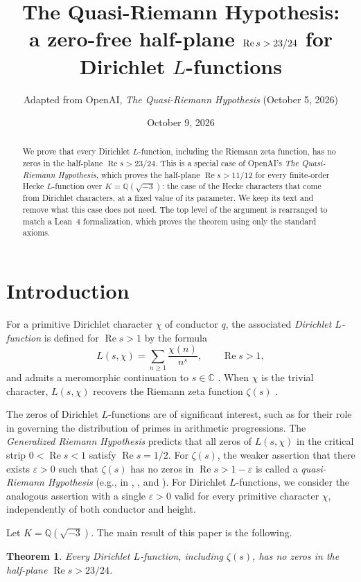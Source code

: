 \documentclass[11pt,a4paper]{article}
\title{The Quasi-Riemann Hypothesis:\\ a zero-free half-plane $\Rea s>23/24$ for Dirichlet $L$-functions}
\author{Adapted from OpenAI, \emph{The Quasi-Riemann Hypothesis} (October 5, 2026)}
\date{October 9, 2026}
\numberwithin{equation}{section}
\numberwithin{figure}{section}
\newtheorem{theorem}{Theorem}[section]
\theoremstyle{definition}
\theoremstyle{remark}
\newcommand{\Q}{\mathbb Q}
\newcommand{\C}{\mathbb C}
\newcommand{\Rea}{\operatorname{Re}}
\begin{document}
\maketitle
\begin{abstract}
We prove that every Dirichlet $L$-function, including the Riemann zeta function, has no zeros in the half-plane $\Rea s>23/24$. This is a special case of OpenAI's \emph{The Quasi-Riemann Hypothesis}, which proves the half-plane $\Rea s>11/12$ for every finite-order Hecke $L$-function over $K=\Q(\sqrt{-3})$: the case of the Hecke characters that come from Dirichlet characters, at a fixed value of its parameter. We keep its text and remove what this case does not need. The top level of the argument is rearranged to match a Lean~4 formalization, which proves the theorem using only the standard axioms.
\end{abstract}

\tableofcontents

\section{Introduction}\label{sec:intro}

For a primitive Dirichlet character $\chi$ of conductor $q$, the associated \emph{Dirichlet $L$-function} is defined for $\Rea s>1$ by the formula
\[
 L(s,\chi)=\sum_{n\ge1}\frac{\chi(n)}{n^s}, \qquad \Rea s>1,
\]
and admits a meromorphic continuation to $s \in \C$ \cite[\S4.6]{IK04}. When $\chi$ is the trivial character, $L(s, \chi)$ recovers the Riemann zeta function $\zeta(s)$ \cite{Rie59}.

The zeros of Dirichlet $L$-functions are of significant interest, such as for their role in governing the distribution of primes in arithmetic progressions. The \emph{Generalized Riemann Hypothesis} predicts that all zeros of $L(s, \chi)$ in the critical strip $0 < \Rea s < 1$ satisfy $\Rea s = 1/2$.
For $\zeta(s)$, the weaker assertion that there exists
$\varepsilon>0$ such that $\zeta(s)$ has no zeros in
$\Rea s>1-\varepsilon$ is called a \emph{quasi-Riemann Hypothesis}
(e.g., in \cite[\S1]{BG17}, \cite[p.~274]{MS02}, and \cite[\S2]{BR18}).
For Dirichlet $L$-functions, we consider the analogous assertion
with a single $\varepsilon>0$ valid for every primitive character
$\chi$, independently of both conductor and height.



Let $K=\Q(\sqrt{-3})$. The main result of this paper is the following.

\begin{theorem}\label{thm:main}
Every Dirichlet $L$-function, including $\zeta(s)$, has no zeros in the half-plane $\Rea s>23/24$.
\end{theorem}
\end{document}
